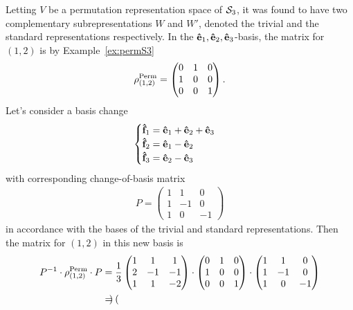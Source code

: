 {\allowdisplaybreaks\begin{example}
	Letting $V$ be a permutation representation space of $\mathcal{S}_3$, it was found to have two complementary subrepresentations $W$ and $W'$, denoted the trivial and the standard representations respectively. In the $\mathbf{\hat{e}}_1, \mathbf{\hat{e}}_2, \mathbf{\hat{e}}_3$-basis, the matrix for $(1,2)$ is by Example~\ref{ex:permS3}
	\begin{align*}
		\rho^{\text{Perm}}_{(1,2)} = \begin{pmatrix}
			0&1&0 \\ 1&0&0 \\ 0&0&1
		\end{pmatrix}.
	\end{align*}
	Let's consider a basis change 
	\begin{align*}
		\begin{cases}
			\mathbf{\hat{f}}_1 = \mathbf{\hat{e}}_1 + \mathbf{\hat{e}}_2 + \mathbf{\hat{e}}_3 \\
			\mathbf{\hat{f}}_2 = \mathbf{\hat{e}}_1 - \mathbf{\hat{e}}_2 \\
			\mathbf{\hat{f}}_3 = \mathbf{\hat{e}}_2 - \mathbf{\hat{e}}_3
		\end{cases}
	\end{align*}
	with corresponding change-of-basis matrix
	\begin{align*}
		P = \begin{pmatrix}
			1&1&0 \\ 1&-1&0 \\ 1&0&-1
		\end{pmatrix}
	\end{align*}
	in accordance with the bases of the trivial and standard representations. Then the matrix for $(1,2)$ in this new basis is
	\begin{align*}
		 P^{-1} \cdot \rho^{\text{Perm}}_{(1,2)} \cdot P &= 
		 \frac{1}{3}\begin{pmatrix}
		 	1&1&1\\2&-1&-1\\1&1&-2
		 \end{pmatrix} \cdot \begin{pmatrix}
			 0&1&0 \\ 1&0&0 \\ 0&0&1
		 \end{pmatrix} \cdot \begin{pmatrix}
			 1&1&0 \\ 1&-1&0 \\ 1&0&-1
		 \end{pmatrix} \\
		 &= \begin{pmatrix}

\end{pmatrix}
\end{align*}
\end{example}}
